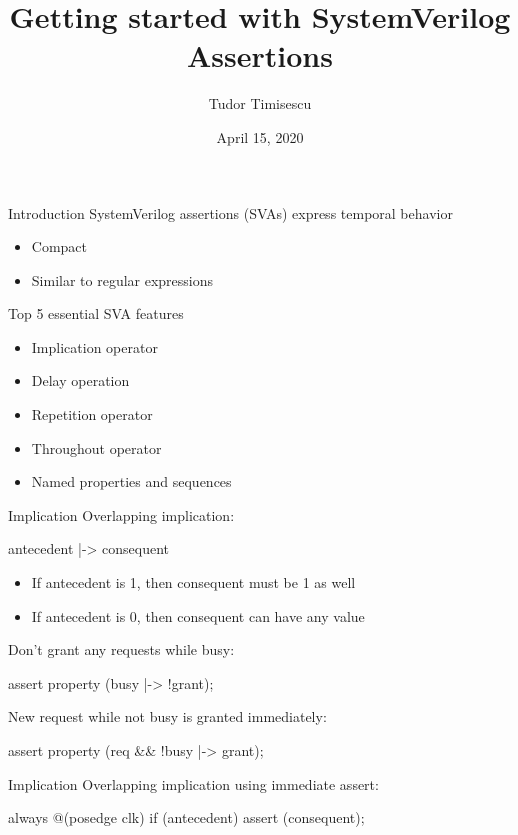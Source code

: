 \documentclass{beamer}
\title{Getting started with SystemVerilog Assertions}
\author{Tudor Timisescu}
\institute{VerificationGentleman.com}
\date{April 15, 2020}
\begin{document}
\begin{frame}
\titlepage
\end{frame}


\begin{frame}{Introduction}
SystemVerilog assertions (SVAs) express temporal behavior

\begin{itemize}
 \item Compact
 \item Similar to regular expressions
\end{itemize}
\end{frame}


\begin{frame}{Top 5 essential SVA features}
\begin{itemize}
 \item Implication operator
 \item Delay operation
 \item Repetition operator
 \item Throughout operator
 \item Named properties and sequences
\end{itemize}
\end{frame}


\begin{frame}{Implication}
Overlapping implication:

\begin{semiverbatim}
antecedent |-> consequent
\end{semiverbatim}

\begin{itemize}
 \item If antecedent is 1, then consequent must be 1 as well
 \item If antecedent is 0, then consequent can have any value
\end{itemize}

\pause
Don't grant any requests while busy:
\begin{semiverbatim}
assert property (busy |-> !grant);
\end{semiverbatim}

\pause
New request while not busy is granted immediately:
\begin{semiverbatim}
assert property (req \&\& !busy |-> grant);
\end{semiverbatim}
\end{frame}


\begin{frame}[fragile]{Implication}
Overlapping implication using immediate assert:

\begin{semiverbatim}
always @(posedge clk)
  if (antecedent)
    assert (consequent);
\end{semiverbatim}
\end{frame}
\end{document}
